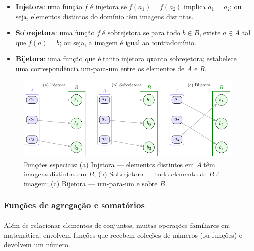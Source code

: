\documentclass[12pt,a4paper]{article}
\def\emph#1{#1}%
\begin{document}
\begin{itemize}
    \item \textbf{Injetora}: uma função \(f\) é injetora se \(f(a_1) = f(a_2)\) implica \(a_1 = a_2\); ou seja, elementos distintos do domínio têm imagens distintas.
    \item \textbf{Sobrejetora}: uma função \(f\) é sobrejetora se para todo \(b \in B\), existe \(a \in A\) tal que \(f(a) = b\); ou seja, a imagem é igual ao contradomínio.
    \item \textbf{Bijetora}: uma função que é tanto injetora quanto sobrejetora; estabelece uma correspondência um-para-um entre os elementos de \(A\) e \(B\).

\end{itemize}


\begin{figure}[H]
    \centering
    \includegraphics[width=0.9\linewidth]{figures/fig_inj_sobre_bij.pdf}

    \caption{Funções especiais: (a) Injetora — elementos distintos em $A$ têm imagens distintas em $B$; (b) Sobrejetora — todo elemento de $B$ é imagem; (c) Bijetora — um-para-um e sobre $B$.}
    \label{fig:inj-sobre-bij}\end{figure}


\subsubsection{Funções de agregação e somatórios}

\paragraph{}
Além de relacionar elementos de conjuntos, muitas operações familiares em matemática, envolvem \emph{funções} que recebem coleções de números (ou funções) e devolvem um número.
\end{document}
